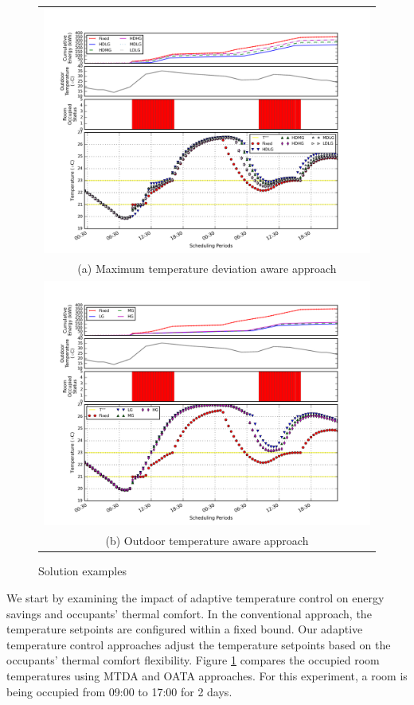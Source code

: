 \begin{figure}
\centering
\begin{tabular}{c}
  \includegraphics[width=1\linewidth]{figs/atc_mtda.png} \\
(a) Maximum temperature deviation aware approach \\[6pt]
  \includegraphics[width=1\linewidth]{figs/atc_oata.png} \\
(b) Outdoor temperature aware approach \\[6pt]
\end{tabular}
\caption{Solution examples}
\label{fig:atc_impacteg}
\end{figure}

We start by examining the impact of adaptive temperature control on energy savings and occupants' thermal comfort. In the conventional approach, the temperature setpoints are configured within a fixed bound. Our adaptive temperature control approaches adjust the temperature setpoints based on the occupants' thermal comfort flexibility. Figure \ref{fig:atc_impacteg} compares the occupied room temperatures using MTDA and OATA approaches. For this experiment, a room is being occupied from 09:00 to 17:00 for 2 days. 

